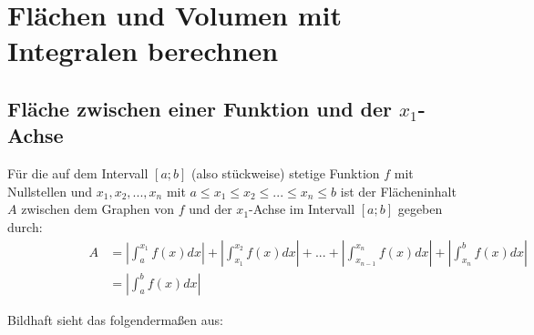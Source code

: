 \section{Flächen und Volumen mit Integralen berechnen}

\subsection{Fläche zwischen einer Funktion und der $x_1$-Achse}
\begin{Definition}
  Für die auf dem Intervall $[a;b]$ (also stückweise) stetige Funktion $f$ mit Nullstellen und $x_1,x_2,...,x_n$
  mit $a \leq x_1 \leq x_2 \leq ... \leq x_n \leq b$ ist der Flächeninhalt $A$ zwischen dem Graphen von $f$ und
  der $x_1$-Achse im Intervall $[a;b]$ gegeben durch:
  \begin{align*}
    \qquad\qquad\qquad A &= \left|{\int_a^{x_1} f(x)dx}\right|+\left|{\int_{x_1}^{x_2} f(x)dx}\right|+...+\left|{\int_{x_{n-1}}^{x_n} f(x)dx}\right|+\left|{\int_{x_n}^b f(x)dx}\right|\\
    &= \left|{\int_a^{b} f(x)dx}\right|
  \end{align*}
\end{Definition}
Bildhaft sieht das folgendermaßen aus:\\

